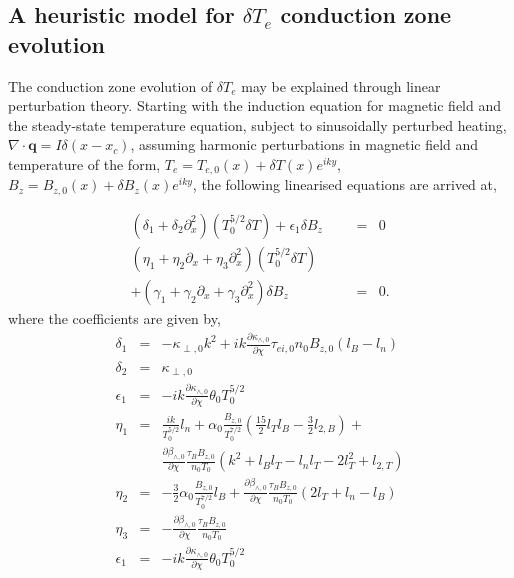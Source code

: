 \documentclass[aip,reprint]{revtex4-1}
\begin{document}
\subsection{A heuristic model for $\delta T_e$ conduction zone evolution}
The  conduction zone evolution of $\delta T_e$ may be explained through linear perturbation theory. Starting with the induction equation for magnetic field and the steady-state temperature equation, subject to sinusoidally perturbed heating, $\nabla \cdot \mathbf{q} = I\delta (x-x_c)$, assuming harmonic perturbations in magnetic field and temperature of the form, $T_{e} = T_{e,0}(x) + \delta T(x)e^{iky}$, $B_{z} = B_{z,0}(x) + \delta B_z(x)e^{iky}$, the following linearised equations are arrived at,

\begin{eqnarray}
(\delta_1 + \delta_2 \partial_x^2 )(T_0^{5/2}\delta T) + \epsilon_1 \delta B_{z} &=& 0\label{eq:linear-analysis-Te}\\
(\eta_1 + \eta_2 \partial_x + \eta_3 \partial^2_x)(T_0^{5/2}\delta T) \qquad&& \nonumber\\
+(\gamma_1 +\gamma_2 \partial_x   + \gamma_3 \partial^2_x)\delta B_z&=& 0.\label{eq:linear-analysis-Bz}
\label{eq:linear-analysis}
\end{eqnarray}
where the coefficients are given by,
\begin{eqnarray}
\delta_1 &=& -\kappa_{\perp,0}k^2 + i k \frac{\partial \kappa_{\wedge,0}}{\partial \chi} \tau_{ei,0} n_0 B_{z,0}\left(l_B - l_n \right) \\
\delta_2 &=& \kappa_{\perp,0} \nonumber\\
\epsilon_1 &=& -i k \frac{\partial \kappa_{\wedge,0}}{\partial \chi} \theta_0 T_0^{5/2} \nonumber\\
\eta_1 &=& \frac{i k }{T_0^{5/2}} l_n +\alpha_0
\frac{ B_{z,0}}{T_0^{7/2}}\left(\frac{15}{2} l_T l_B - \frac{3}{2} l_{2,B}\right) + \nonumber\\
&&\frac{\partial \beta_{\wedge,0}}{\partial \chi}\frac{\tau_B B_{z,0}}{n_0 T_0}\left(k^2 + l_B l_T - l_n l_T - 2l_T^2 + l_{2,T} \right) \nonumber\\
\eta_2 &=& - \frac{3}{2}\alpha_0\frac{B_{z,0}}{T_0^{7/2}}l_B + \frac{\partial \beta_{\wedge,0}}{\partial \chi}\frac{\tau_B B_{z,0}}{n_0 T_0} (2l_T + l_n - l_B) \nonumber\\
\eta_3 &=& - \frac{\partial \beta_{\wedge,0}}{\partial \chi} \frac{\tau_B B_{z,0}}{n_0 T_0} \nonumber\\
\epsilon_1 &=& -i k \frac{\partial \kappa_{\wedge,0}}{\partial \chi} \theta_0 T_0^{5/2} 
\end{eqnarray}
\end{document}
